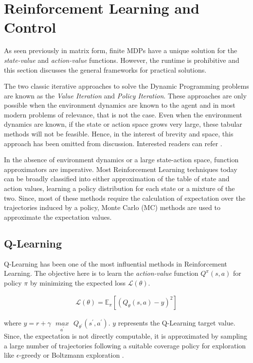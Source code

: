 \documentclass[12pt,a4paper]{article}
\begin{document}
\section{Reinforcement Learning and Control} \label{section:rl_control}

As seen previously in matrix form, finite MDPs have a unique solution for the \textit{state-value}
and \textit{action-value} functions. However, the runtime is prohibitive and this section discusses
the general frameworks for practical solutions.

The two classic iterative approaches to solve the Dynamic Programming problems are known
as the \textit{Value Iteration} and \textit{Policy Iteration}. These approaches are only possible
when the environment dynamics are known to the agent and in most modern problems of
relevance, that is not the case. Even when the environment dynamics are known, if the
state or action space grows very large, these tabular methods will not be feasible. Hence, in the
interest of brevity and space, this approach has been omitted from discussion. Interested
readers can refer \cite{Sutton:1998:IRL:551283}.

In the absence of environment dynamics or a large state-action space, function approximators
are imperative. Most Reinforcement Learning techniques today can be broadly classified into
either approximation of the table of state and action values, learning a policy distribution for
each state or a mixture of the two. Since, most of these methods require the calculation of 
expectation over the trajectories induced by a policy, Monte Carlo (MC) methods are used to 
approximate the expectation values.

\subsection{Q-Learning} \label{section:q_learning}

Q-Learning \cite{Watkins1992} has been one of the most influential methods in Reinforcement
Learning. The objective here is to learn the \textit{action-value} function $Q^\pi(s,a)$ for policy
$\pi$ by minimizing the expected loss $\mathcal{L}(\theta)$.

\begin{align}
\mathcal{L}(\theta) = \mathbb{E}_\pi\left[ (Q_{\theta}(s,a) - y)^2 \right]
\end{align}

where $y = r + \gamma\text{ }\underset{a^\prime}{max}\text{ }Q_{\theta^\prime}(s^\prime,a^
\prime)$. $y$ represents the Q-Learning target value. Since, the expectation is not directly
computable, it is approximated by sampling a large number of trajectories following
a suitable coverage policy for exploration like $\epsilon$-greedy or Boltzmann exploration 
\cite{2017arXiv170510257C}. 
\end{document}
